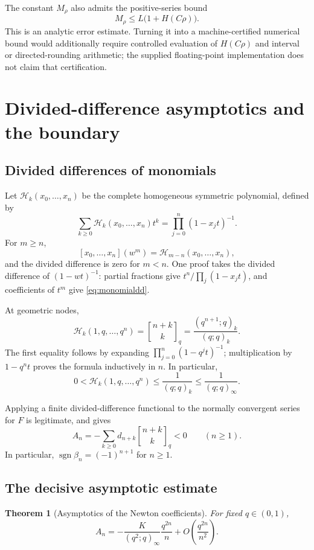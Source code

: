 \documentclass[11pt,letterpaper]{article}
\newtheorem{theorem}{Theorem}[section]
\theoremstyle{definition}\newtheorem{definition}[theorem]{Definition}
\theoremstyle{remark}\newtheorem{remark}[theorem]{Remark}
\newcommand{\qb}[2]{\genfrac{[}{]}{0pt}{}{#1}{#2}_{\!q}}
\newcommand{\cH}{\mathcal H}
\numberwithin{equation}{section}
\begin{document}
The constant $M_\rho$ also admits the positive-series bound
\[
 M_\rho\leq L\bigl(1+H(C\rho)\bigr).
\]
This is an analytic error estimate. Turning it into a machine-certified numerical bound would additionally require controlled evaluation of $H(C\rho)$ and interval or directed-rounding arithmetic; the supplied floating-point implementation does not claim that certification.

\section{Divided-difference asymptotics and the boundary}\label{sec:boundary}

\subsection{Divided differences of monomials}
Let $\cH_k(x_0,\ldots,x_n)$ be the complete homogeneous symmetric polynomial, defined by
\[
 \sum_{k\geq0}\cH_k(x_0,\ldots,x_n)t^k
 =\prod_{j=0}^{n}(1-x_jt)^{-1}.
\]
For $m\geq n$,
\begin{equation}\label{eq:monomialdd}
 [x_0,\ldots,x_n](w^m)=\cH_{m-n}(x_0,\ldots,x_n),
\end{equation}
and the divided difference is zero for $m<n$. One proof takes the divided difference of $(1-wt)^{-1}$: partial fractions give $t^n/\prod_j(1-x_jt)$, and coefficients of $t^m$ give \eqref{eq:monomialdd}.

At geometric nodes,
\begin{equation}\label{eq:homogq}
 \cH_k(1,q,\ldots,q^n)=\qb{n+k}{k}
 =\frac{(q^{n+1};q)_k}{(q;q)_k}.
\end{equation}
The first equality follows by expanding $\prod_{j=0}^{n}(1-q^jt)^{-1}$; multiplication by $1-q^nt$ proves the formula inductively in $n$. In particular,
\begin{equation}\label{eq:homogbounds}
 0<\cH_k(1,q,\ldots,q^n)\leq\frac1{(q;q)_k}
 \leq\frac1{(q;q)_\infty}.
\end{equation}

Applying a finite divided-difference functional to the normally convergent series for $F$ is legitimate, and gives
\begin{equation}\label{eq:Apositive}
 A_n=-\sum_{k\geq0}d_{n+k}\qb{n+k}{k}<0\qquad(n\geq1).
\end{equation}
In particular, $\operatorname{sgn}\beta_n=(-1)^{n+1}$ for $n\geq1$.

\subsection{The decisive asymptotic estimate}
\begin{theorem}[Asymptotics of the Newton coefficients]\label{thm:Aasympt}
For fixed $q\in(0,1)$,
\begin{equation}\label{eq:Aasympt}
 A_n=-\frac{K}{(q^2;q)_\infty}\frac{q^{2n}}n
 +O\left(\frac{q^{2n}}{n^2}\right).
\end{equation}
\end{theorem}
\end{document}
